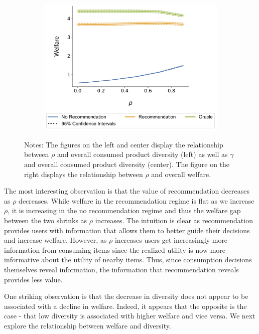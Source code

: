 \documentclass[manuscript]{acmart}
\begin{document}
\begin{figure}[t]
\begin{subfigure}{0.3\linewidth}
  \includegraphics[width=1.0\linewidth]{figures/rho_welfare_N_200_T_20.pdf}
\end{subfigure}
\caption*{\scriptsize Notes: The figures on the left and center display the relationship between $\rho$ and overall consumed product diversity (left) as well as $\gamma$ and overall consumed product diversity (center). The figure on the right displays the relationship between $\rho$ and overall welfare.}
\end{figure}
\addtocounter{figure}{-1}

The most interesting observation is that the value of recommendation decreases as $\rho$ decreases. While welfare in the recommendation regime is flat as we increase $\rho$, it is increasing in the no recommendation regime and thus the welfare gap between the two shrinks as $\rho$ increases. The intuition is clear as recommendation provides users with information that allows them to better guide their decisions and increase welfare. However, as $\rho$ increases users get increasingly more information from consuming items since the realized utility is now more informative about the utility of nearby items. Thus, since consumption decisions themselves reveal information, the information that recommendation reveals provides less value.
\par 
One striking observation is that the decrease in diversity does not appear to be associated with a decline in welfare. Indeed, it appears that the opposite is the case - that low diversity is associated with higher welfare and vice versa. We next explore the relationship between welfare and diversity.
\end{document}
